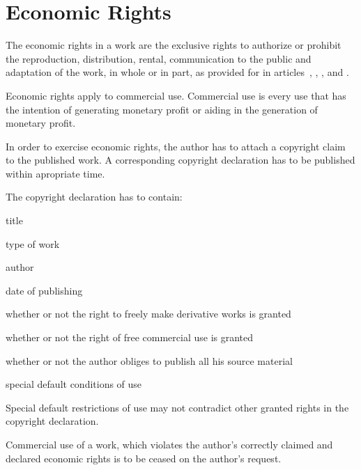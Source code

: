\section{Economic Rights}
\begin{contract}

\label{Par:EconomicRightsGeneral}
\Sentence The economic rights in a work are the exclusive rights to authorize or 
prohibit the reproduction, distribution, rental, communication to the 
public and adaptation of the work, in whole or in part, as provided for in 
articles~, , ,  and .

\Sentence Economic rights apply to commercial use. Commercial use is every use that has the intention of generating monetary profit or aiding in the generation of monetary profit.

\label{Par:ClaimingAndDurationOfEconomicRights}
\Sentence In order to exercise economic rights, the author has to attach a copyright claim to the published work. \Sentence A corresponding copyright declaration has to be published within apropriate time. 

\Sentence The copyright declaration has to contain:
\begin{legalenum}
	\item title
	\item type of work
	\item author
	\item date of publishing
	\item whether or not the right to  freely make derivative works is granted
	\item whether or not the right of free commercial use is granted
	\item whether or not the author obliges to publish all his source material
	\item special default conditions of use
\end{legalenum}

\Sentence Special default restrictions of use may not contradict other granted rights in the copyright declaration.

\Sentence Commercial use of a work, which violates the author's correctly claimed and declared economic rights is to be ceased on the author's request. 


\end{contract}
